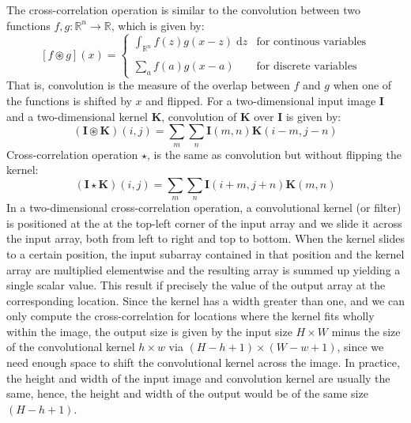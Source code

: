 \documentclass[12pt]{report}
\numberwithin{equation}{section}
\begin{document}
The cross-correlation operation is similar to the convolution between two functions $f,g:\mathbb{R}^n \rightarrow \mathbb{R}$, which is given by:
\begin{equation}\label{eqn:conv}
[f \circledast g](x) = 
\left\{\begin{array}{cc}
\displaystyle\int_{\mathbb{R}^n} f(z)g(x - z)\;\mathrm{d}z & \text{for continous variables} \\
\\
\displaystyle\sum_{a} f(a)g(x - a) & \text{for discrete variables}
\end{array}\right.
\end{equation}
That is, convolution is the measure of the overlap between $f$ and $g$ when one of the functions is shifted by $x$ and flipped. For a two-dimensional input image $\bm{I}$ and a two-dimensional kernel $\bm{K}$, convolution of $\bm{K}$ over $\bm{I}$ is given by:
\begin{equation}\label{eqn:2d_conv}
(\bm{I} \circledast \bm{K}) (i,j) = \sum_m \sum_n \bm{I}(m,n) \bm{K}(i-m,j-n)
\end{equation}
Cross-correlation operation $\star$, is the same as convolution but without flipping the kernel:
\begin{equation}\label{eqn:2d_cross}
(\bm{I} \star \bm{K}) (i,j) = \sum_m \sum_n \bm{I}(i+m,j+n) \bm{K}(m,n)
\end{equation} \noindent
In a two-dimensional cross-correlation operation, a convolutional kernel (or filter) is positioned at the at the top-left corner of the input array and we slide it across the input array, both from left to right and top to bottom. When the kernel slides to a certain position, the input subarray contained in that position and the kernel array are multiplied elementwise and the resulting array is summed up yielding a single scalar value. This result if precisely the value of the output array at the corresponding location. Since the kernel has a width greater than one, and we can only compute the cross-correlation for locations where the kernel fits wholly within the image, the output size is given by the input size $H \times W$ minus the size of the convolutional kernel $h \times w$ via $(H - h + 1) \times (W - w + 1)$, since we need enough space to shift the convolutional kernel across the image. In practice, the height and width of the input image and convolution kernel are usually the same, hence, the height and width of the output would be of the same size $(H - h + 1)$.
\end{document}
